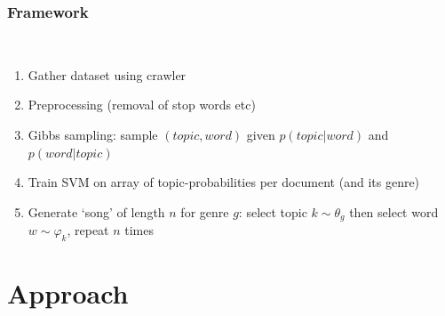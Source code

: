 \documentclass[t,ignorenonframetext]{beamer}
\begin{document}
\begin{frame}
\frametitle{Framework}~\\
\begin{enumerate}
	\item Gather dataset using crawler
	\item Preprocessing (removal of stop words etc)
	\item Gibbs sampling: sample $(topic,word)$ given $p(topic|word)$ and $p(word|topic)$
	\item Train SVM on array of topic-probabilities per document (and its genre)
	\item Generate `song' of length $n$ for genre $g$: select topic $k \sim \theta_g$ then select word $w \sim \varphi_k$, repeat $n$ times
\end{enumerate}

\end{frame}

\section[Approach]{Approach}
\end{document}
